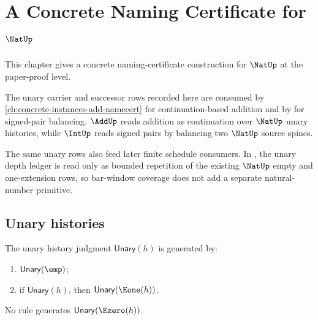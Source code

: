 \chapter{A Concrete Naming Certificate for \(\NatUp\)}
\label{ch:concrete-instances-nat-namecert}

This chapter gives a concrete naming-certificate construction for \(\NatUp\) at the paper-proof level.

The unary carrier and successor rows recorded here are consumed by \autoref{ch:concrete-instances-add-namecert} for continuation-based addition and by  for signed-pair balancing. $\AddUp$ reads addition as continuation over $\NatUp$ unary histories, while $\IntUp$ reads signed pairs by balancing two $\NatUp$ source spines.

The same unary rows also feed later finite schedule consumers. In , the unary depth ledger is read only as bounded repetition of the existing $\NatUp$ empty and one-extension rows, so bar-window coverage does not add a separate natural-number primitive.

\section{Unary histories}

\begin{definition}
\label{def:unary-history-judgment}
\label{def:unary-repetition-histories}
The unary history judgment \(\mathsf{Unary}(h)\) is generated by:
\begin{enumerate}
  \item \(\mathsf{Unary}(\emp)\);
  \item if \(\mathsf{Unary}(h)\), then \(\mathsf{Unary}(\Eone(h))\).
\end{enumerate}
No rule generates \(\mathsf{Unary}(\Ezero(h))\).
\end{definition}

